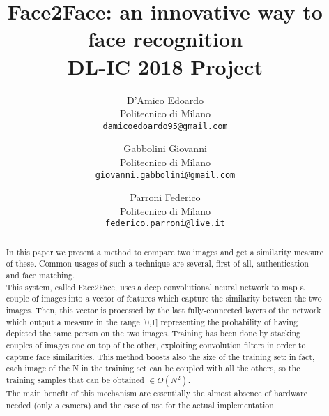 \documentclass[10pt,twocolumn,letterpaper]{article}
\begin{document}
\title{Face2Face: an innovative way to face recognition \\ DL-IC 2018 Project} 

\author{D'Amico Edoardo\\
Politecnico di Milano\\
{\tt\small damicoedoardo95@gmail.com}
\and
Gabbolini Giovanni\\
Politecnico di Milano\\
{\tt\small giovanni.gabbolini@gmail.com}
\and
Parroni Federico\\
Politecnico di Milano\\
{\tt\small federico.parroni@live.it}
}

\maketitle

\begin{abstract}
In this paper we present a method to compare two images and get a similarity measure of these. Common usages of such a technique are several, first of all, authentication and face matching.
\\
This system, called Face2Face, uses a deep convolutional neural network to map a couple of images into a vector of features which capture the similarity between the two images. Then, this vector is processed by the last fully-connected layers of the network which output a measure in the range [0,1] representing the probability of having depicted the same person on the two images. Training has been done by stacking couples of images one on top of the other, exploiting convolution filters in order to capture face similarities. This method boosts also the size of the training set: in fact, each image of the N in the training set can be coupled with all the others, so the training samples that can be obtained $\in O(N^2)$.
\\
The main benefit of this mechanism are essentially the almost absence of hardware needed (only a camera) and the ease of use for the actual implementation. 
\end{abstract}

\end{document}

